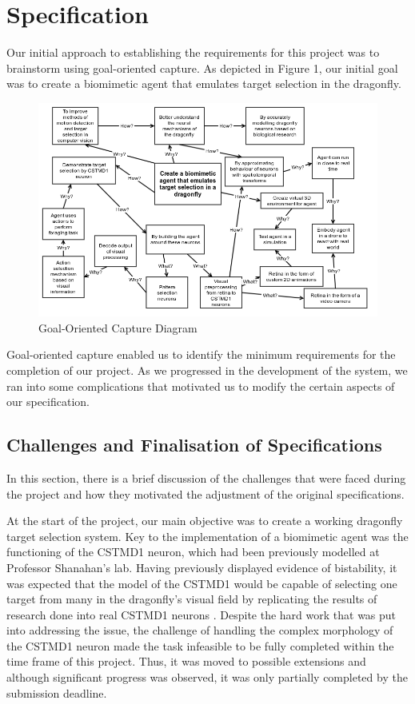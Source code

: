 \documentclass[a4paper,11pt]{article}
\begin{document}
\section{Specification}

Our initial approach to establishing the requirements for this project was to brainstorm using goal-oriented capture. As depicted in Figure 1, our initial goal was to create a biomimetic agent that emulates target selection in the dragonfly. 
	
	\begin{figure}[h]
	\begin{center}
	\includegraphics[scale = 0.5]{goalorient}
	\end{center}
	\caption{Goal-Oriented Capture Diagram}
	\end{figure}	
	
	Goal-oriented capture enabled us to identify the minimum requirements for the completion of our project. As we progressed in the development of the system, we ran into some complications that motivated us to modify the certain aspects of our specification.
	 
\subsection{Challenges and Finalisation of Specifications}
In this section, there is a brief discussion of the challenges that were faced during the project and how they motivated the adjustment of the original specifications.

	At the start of the project, our main objective was to create a working dragonfly target selection system. Key to the implementation of a biomimetic agent was the functioning of the CSTMD1 neuron, which had been previously modelled at Professor Shanahan's lab. Having previously displayed evidence of bistability, it was expected that the model of the CSTMD1 would be capable of selecting one target from many in the dragonfly's visual field by replicating the results of research done into real CSTMD1 neurons \cite{w13}. Despite the hard work that was put into addressing the issue, the challenge of handling the complex morphology of the CSTMD1 neuron made the task infeasible to be fully completed within the time frame of this project. Thus, it was moved to possible extensions and although significant progress was observed, it was only partially completed by the submission deadline.
	
\end{document}
